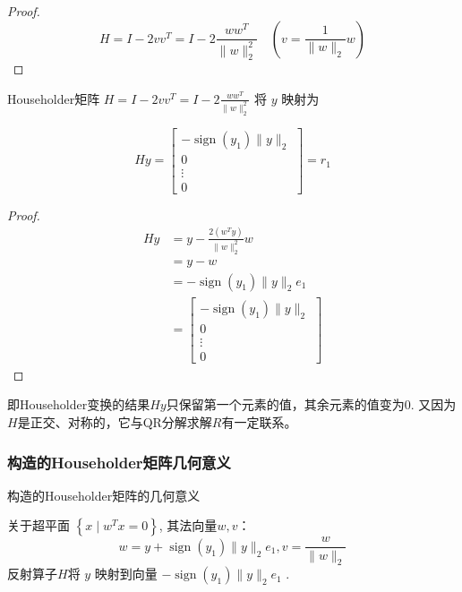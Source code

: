 \begin{proof}
    $$ H=I-2 v v^{T}=I-2 \frac{w w^{T}}{\|w\|_{2}^{2}} \quad(v=\frac{1}{\|w\|_{2}} w) $$
\end{proof}

\begin{theorem}
    Householder矩阵 $ H=I-2 v v^{T}=I-2 \frac{w w^{T}}{\|w\|_{2}^{2}} $ 将 $ y $ 映射为

   $$ H y = \left[\begin{array}{c}-\operatorname{sign}\left(y_{1}\right)\|y\|_{2} \\ 0 \\ \vdots \\ 0\end{array}\right] = r_1 $$
\end{theorem}


\begin{proof}
    $$ 
\begin{aligned}
    H y&=y-\frac{2\left(w^{T} y\right)}{\|w\|_{2}^{2}} w\\
    &=y-w\\
    &=-\operatorname{sign}\left(y_{1}\right)\|y\|_{2} e_{1}\\
    &=\left[\begin{array}{c}-\operatorname{sign}\left(y_{1}\right)\|y\|_{2} \\ 0 \\ \vdots \\ 0\end{array}\right]
\end{aligned}
 $$
\end{proof}

即Householder变换的结果$Hy$只保留第一个元素的值，其余元素的值变为0. 又因为$H$是正交、对称的，它与QR分解求解$R$有一定联系。

\subsubsection{构造的Householder矩阵几何意义}


\begin{FigureCenter}{构造的Householder矩阵的几何意义}
   
\end{FigureCenter}


关于超平面 $ \left\{x \mid w^{T} x=0\right\} $, 其法向量$w,v$：
$$
w=y+\operatorname{sign}\left(y_{1}\right)\|y\|_{2} e_{1},v=\frac{w}{\|w\|_{2}}
$$
反射算子$H$将 $ y $ 映射到向量 $ -\operatorname{sign}\left(y_{1}\right)\|y\|_{2} e_{1} $ .

